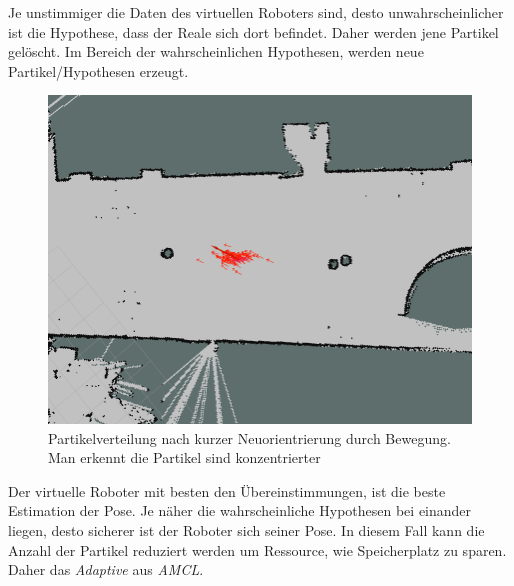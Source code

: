 \documentclass[11pt,a4paper]{article}
\begin{document}
{	Je unstimmiger die Daten des virtuellen Roboters sind, desto unwahrscheinlicher ist die Hypothese, dass der Reale sich dort befindet. Daher werden jene Partikel gel\"oscht. Im Bereich der wahrscheinlichen Hypothesen, werden neue Partikel/Hypothesen erzeugt.
	
\begin{figure}[h]
	\includegraphics[width=\linewidth]{pictures/drive_little.jpg}
	\caption{Partikelverteilung nach kurzer Neuorientrierung durch Bewegung. Man erkennt die Partikel sind konzentrierter}
\end{figure}
		
	Der virtuelle Roboter  mit besten den \"Ubereinstimmungen, ist die beste Estimation der Pose.
	Je n\"aher die wahrscheinliche Hypothesen bei einander liegen, desto sicherer ist der Roboter sich seiner Pose. In diesem Fall kann die Anzahl der Partikel reduziert werden um Ressource, wie Speicherplatz zu sparen. Daher das \textit{Adaptive} aus \textit{AMCL}.
}
\newpage
\end{document}

